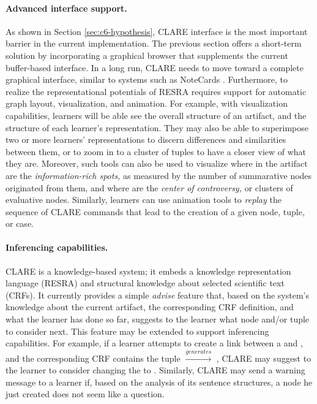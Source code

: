 \paragraph{Advanced interface support.}

As shown in Section \ref{sec:c6-hypothesis}, CLARE interface is the most
important barrier in the current implementation. The previous section
offers a short-term solution by incorporating a graphical browser that
supplements the current buffer-based interface. In a long run, CLARE needs
to move toward a complete graphical interface, similar to systems such as
NoteCards \cite{Halasz87Notecards}. Furthermore, to realize the
representational potentials of RESRA requires support for automatic graph
layout, visualization, and animation. For example, with visualization
capabilities, learners will be able see the overall structure of an
artifact, and the structure of each learner's representation. They may also
be able to superimpose two or more learners' representations to discern
differences and similarities between them, or to zoom in to a cluster of
tuples to have a closer view of what they are.  Moreover, such tools can
also be used to visualize where in the artifact are the {\it information-rich
spots,\/} as measured by the number of summarative nodes originated from
them, and where are the {\it center of controversy,\/} or clusters of
evaluative nodes.  Similarly, learners can use animation tools to
{\it replay\/} the sequence of CLARE commands that lead to the creation of a
given node, tuple, or case.


\paragraph{Inferencing capabilities.}

CLARE is a knowledge-based system; it embeds a knowledge representation
language (RESRA) and structural knowledge about selected scientific text
(CRFs). It currently provides a simple {\it advise\/} feature that, based
on the system's knowledge about the current artifact, the corresponding CRF
definition, and what the learner has done so far, suggests to the learner
what node and/or tuple to consider next. This feature may be extended to
support inferencing capabilities. For example, if a learner attempts to
create a link between a  and , and
the corresponding CRF contains the tuple  \(\stackrel{
generates}{\longrightarrow}\) , CLARE may suggest to
the learner to consider changing the  to . Similarly, CLARE may send a warning message to a learner if,
based on the analysis of its sentence structures, a 
node he just created does not seem like a question.


